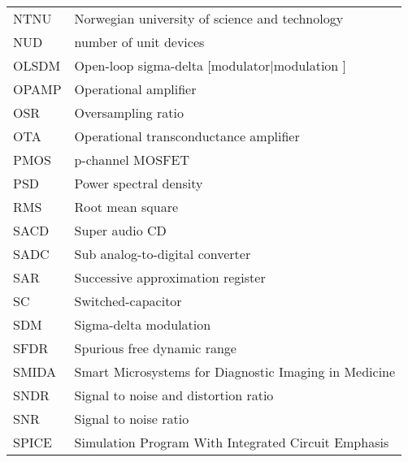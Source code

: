 \begin{table}[h]
\begin{tabular}{l l}
NTNU & Norwegian university of science and technology\\
NUD & number of unit devices\\
OLSDM & Open-loop sigma-delta [modulator|modulation ]\\
OPAMP & Operational amplifier\\
OSR & Oversampling ratio\\
OTA & Operational transconductance amplifier\\
PMOS & p-channel MOSFET\\
PSD & Power spectral density\\
RMS & Root mean square\\
SACD & Super audio CD\\
SADC & Sub analog-to-digital converter\\
SAR & Successive approximation register\\
SC & Switched-capacitor\\
SDM & Sigma-delta modulation\\
SFDR & Spurious free dynamic range\\
SMIDA & Smart Microsystems for Diagnostic Imaging in Medicine \\
SNDR & Signal to noise and distortion ratio\\
SNR & Signal to noise ratio\\
SPICE & Simulation Program With Integrated Circuit Emphasis\\

\end{tabular} 
\end{table}
